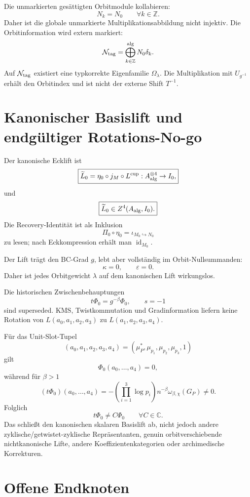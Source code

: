 \documentclass[11pt,a4paper]{article}
\begin{document}
Die unmarkierten gesättigten Orbitmodule kollabieren:
\[
 \boxed{N_k=N_0\qquad\forall k\in\mathbb Z.}
\]
Daher ist die globale unmarkierte Multiplikationsabbildung nicht injektiv. Die Orbitinformation wird extern markiert:
\[
 \mathcal N_{\rm tag}=\bigoplus_{k\in\mathbb Z}^{\rm alg}N_0\delta_k.
\]
Auf $\mathcal N_{\rm tag}$ existiert eine typkorrekte Eigenfamilie $\Omega_\lambda$. Die Multiplikation mit $U_{g^{-1}}$ erhält den Orbitindex und ist nicht der externe Shift $T^{-1}$.

\section{Kanonischer Basislift und endgültiger Rotations-No-go}

Der kanonische Ecklift ist
\[
 \boxed{\widetilde L_0=\eta_0\circ j_M\circ L^{\rm cup}:
 A_{\rm alg}^{\otimes4}\to I_0,}
\]
und
\[
 \boxed{\widetilde L_0\in Z^4(A_{\rm alg},I_0).}
\]
Die Recovery-Identität ist als Inklusion
\[
 \Pi_0\circ\eta_0=\iota_{M_0\hookrightarrow N_0}
\]
zu lesen; nach Eckkompression erhält man $\operatorname{id}_{M_0}$.

Der Lift trägt den BC-Grad $g$, lebt aber vollständig im Orbit-Nullsummanden:
\[
 \boxed{\kappa=0,\qquad\varepsilon=0.}
\]
Daher ist jedes Orbitgewicht $\lambda$ auf dem kanonischen Lift wirkungslos.

Die historischen Zwischenbehauptungen
\[
 t\Phi_0=g^{-\beta}\Phi_0,
 \qquad s=-1
\]
sind superseded. KMS, Twistkommutation und Gradinformation liefern keine Rotation von $L(a_0,a_1,a_2,a_3)$ zu $L(a_1,a_2,a_3,a_4)$.

Für das Unit-Slot-Tupel
\[
 (a_0,a_1,a_2,a_3,a_4)=(\mu_P^*,\mu_{p_1},\mu_{p_2},\mu_{p_3},1)
\]
gilt
\[
 \Phi_0(a_0,\ldots,a_4)=0,
\]
während für $\beta>1$
\[
 (t\Phi_0)(a_0,\ldots,a_4)
 =-\left(\prod_{i=1}^3\log p_i\right)n^{-\beta}\omega_{\beta,\chi}(G_P)\neq0.
\]
Folglich
\[
 \boxed{t\Phi_0\neq C\Phi_0\qquad\forall C\in\mathbb C.}
\]
Das schließt den kanonischen skalaren Basislift ab, nicht jedoch andere zyklische/getwistet-zyklische Repräsentanten, genuin orbitverschiebende nichtkanonische Lifte, andere Koeffizientenkategorien oder archimedische Korrekturen.

\section{Offene Endknoten}
\end{document}
